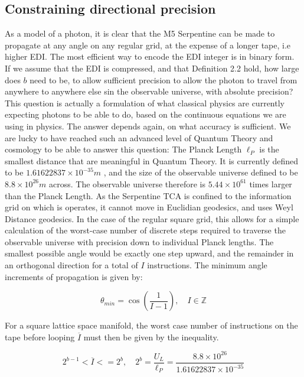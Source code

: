 \documentclass[notitlepage]{article}
\begin{document}
\subsection{Constraining directional precision}
As a model of a photon, it is clear that the M5 Serpentine can be made to propagate at any angle on any regular grid, at the expense of a longer tape, i.e higher EDI. The most efficient way to encode the EDI integer is in binary form. If we assume that the EDI is compressed, and that Definition 2.2 hold, how large does $b$ need to be, to allow sufficient precision to allow the photon to travel from anywhere to anywhere else sin the observable universe, with absolute precision? This question is actually a formulation of what classical physics are currently expecting photons to be able to do, based on the continuous  equations  we are using in physics. The answer depends again, on what accuracy is sufficient. We are lucky to have reached such an advanced level of Quantum Theory and cosmology to be able to answer this question: The Planck Length $\ell_P$ is the smallest distance that are meaningful in Quantum Theory. It is currently defined to be $1.61622837 \times 10^{-35} m $ , and the size of the observable universe defined to be $8.8\times10^{26} m$ across. The observable universe therefore is $5.44 \times 10^{61}$ times larger than the Planck Length. As the Serpentine TCA is confined to the information grid on which is operates, it cannot move in Euclidian geodesics, and uses Weyl Distance geodesics. In the case of the regular square grid, this allows for a simple calculation of the worst-case number of discrete steps required to traverse the observable universe with precision down to individual Planck lengths. The smallest possible angle would be exactly one step upward, and the remainder in an orthogonal direction for a total of $I$ instructions.
The minimum angle increments of propagation is given by:

\begin{equation}
\theta_{min}  = \cos(\frac{1}{I-1}), \quad I \in \mathbb{Z}
\end{equation}

For a square lattice space manifold, the worst case number of instructions on the tape before looping $\overline{I}$ must then be given by the inequality.

\begin{equation}\label{eq:universesize}
2^{b-1}< \overline{I} <= 2^b, \quad  2^b = \frac{U_L}{\ell_P} = \frac{8.8\times10^{26} }{1.61622837 \times 10^{-35}} 
\end{equation}
\end{document}
